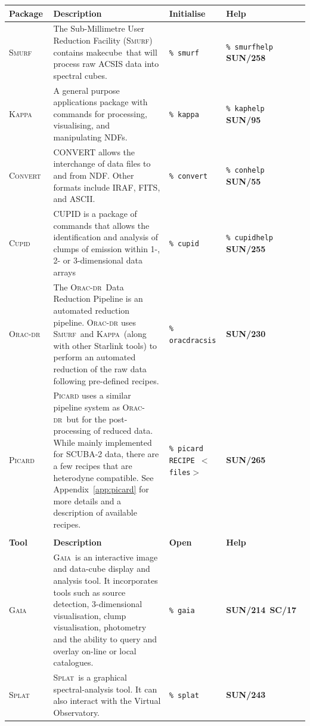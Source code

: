 \documentclass[twoside,11pt]{article}
\newcommand{\htmladdnormallink}[2]{#1}
\newcommand{\htmlref}[2]{#1}
\newcommand{\latexhtml}[2]{#1}
\newcommand{\xref}[3]{#1}
\renewcommand{\_}{\texttt{\symbol{95}}}
\newcommand{\convert}{\xref{\textsc{Convert}}{sun55}{}}
\newcommand{\cupid}{\xref{\textsc{Cupid}}{sun255}{}}
\newcommand{\gaia}{\xref{\textsc{Gaia}}{sun214}{}}
\newcommand{\Kappa}{\xref{\textsc{Kappa}}{sun95}{}}
\newcommand{\oracdr}{\htmladdnormallink{\textsc{Orac-dr}}{http://www.oracdr.org/oracdr}}
\newcommand{\smurf}{\xref{\textsc{Smurf}}{sun258}{}}
\newcommand{\splat}{\xref{\textsc{Splat}}{sun243}{}}
\newcommand{\task}[1]{\textsf{#1}}
\newcommand{\makecube}{\xref{\task{makecube}}{sun258}{MAKECUBE}}
\newcommand{\gaiasun}{\xref{\textbf{SUN/214}}{sun214}{}}
\newcommand{\kappasun}{\xref{\textbf{SUN/95}}{sun95}{}}
\newcommand{\picardsun}{\xref{\textbf{SUN/265}}{sun265}{}}
\newcommand{\smurfsun}{\xref{\textbf{SUN/258}}{sun258}{}}
\newcommand{\convertsun}{\xref{\textbf{SUN/55}}{sun55}{}}
\newcommand{\cupidsun}{\xref{\textbf{SUN/255}}{sun255}{}}
\newcommand{\oracdrsun}{\xref{\textbf{SUN/230}}{sun230}{}}
\newcommand{\gaiasc}{\xref{\textbf{SC/17}}{sc17}{}}
\newcommand{\splatsun}{\xref{\textbf{SUN/243}}{sun243}{}}
\newcommand{\cref}[3]{\latexhtml{#1~\ref{#2}}{\htmlref{#3}{#2}}}
\begin{document}
\begin{table}[h!]
\begin{tabular}{p{1.7cm}|p{7.4cm}|p{2.9cm}|p{2.2cm}}

\textbf{Package} & \textbf{Description} & \textbf{Initialise}  & \textbf{Help}\\
\hline
\smurf\ & The Sub-Millimetre User Reduction Facility (\smurf) contains \makecube\ that will process raw ACSIS data into spectral cubes. & \texttt{\%\,smurf} & \texttt{\%\,smurfhelp} \newline \smurfsun\\
\hline
\Kappa\ & A general purpose  applications package with commands for processing, visualising, and manipulating NDFs. & \texttt{\%\,kappa} & \texttt{\%\,kaphelp} \newline \kappasun\ \\
\hline
\convert\ &  CONVERT allows the interchange of data files to and from NDF. Other formats include IRAF, FITS, and ASCII. & \texttt{\%\,convert} & \texttt{\%\,conhelp} \newline \convertsun\ \\
\hline
\cupid\ & CUPID is a package of commands that allows the identification and analysis of clumps of emission within 1-, 2- or 3-dimensional data arrays &  \texttt{\%\,cupid} & \texttt{\%\,cupidhelp} \newline \cupidsun\ \\
\hline
\oracdr\ & The \oracdr\ Data Reduction Pipeline \cite{oracdr} is an automated reduction pipeline. \textsc{Orac-dr} uses
\smurf\ and \Kappa\ (along with other Starlink tools) to perform an automated
reduction of the raw data following pre-defined recipes.& \texttt{\%\,oracdr\_acsis} &  \oracdrsun \\
\hline
\textsc{Picard} &  \textsc{Picard} uses a similar pipeline system as \oracdr\ but for the post-processing of reduced data. While mainly implemented for SCUBA-2 data, there are a few recipes that are heterodyne compatible. See \cref{Appendix}{app:picard}{Picard} for more details and a description of available recipes.& \texttt{\%\,picard RECIPE $<$files$>$} & \picardsun\ \\
\hline
\multicolumn{4}{l}{}\\
\textbf{Tool} & \textbf{Description} & \textbf{Open}  & \textbf{Help}\\
\hline
\gaia\ & \gaia\ is an interactive image and data-cube display and analysis tool. It incorporates tools such
as source detection, 3-dimensional visualisation, clump visualisation, photometry and the ability
to query and overlay on-line or local catalogues. & \texttt{\%\,gaia} & \gaiasun\ \gaiasc\ \\
\hline
\splat\ & \splat\ is a graphical spectral-analysis tool. It can also interact with the Virtual Observatory.  & \texttt{\%\,splat}  & \splatsun\ \\
\hline
\end{tabular}
\end{table}
\end{document}
